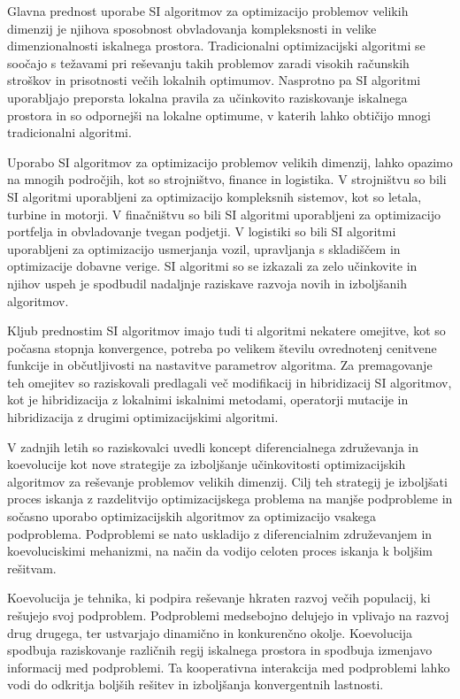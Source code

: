 Glavna prednost uporabe SI algoritmov za optimizacijo problemov velikih dimenzij je njihova sposobnost obvladovanja kompleksnosti in velike dimenzionalnosti iskalnega prostora.
Tradicionalni optimizacijski algoritmi se soočajo s težavami pri reševanju takih problemov zaradi visokih računskih stroškov in prisotnosti večih lokalnih optimumov.
Nasprotno pa SI algoritmi uporabljajo preporsta lokalna pravila za učinkovito raziskovanje iskalnega prostora in so odpornejši na lokalne optimume, v katerih lahko obtičijo mnogi tradicionalni algoritmi.

Uporabo SI algoritmov za optimizacijo problemov velikih dimenzij, lahko opazimo na mnogih področjih, kot so strojništvo, finance in logistika.
V strojništvu so bili SI algoritmi uporabljeni za optimizacijo kompleksnih sistemov, kot so letala, turbine in motorji.
V finačništvu so bili SI algoritmi uporabljeni za optimizacijo portfelja in obvladovanje tvegan podjetji.
V logistiki so bili SI algoritmi uporabljeni za optimizacijo usmerjanja vozil, upravljanja s skladiščem in optimizacije dobavne verige.
SI algoritmi so se izkazali za zelo učinkovite in njihov uspeh je spodbudil nadaljnje raziskave razvoja novih in izboljšanih algoritmov.

Kljub prednostim SI algoritmov imajo tudi ti algoritmi nekatere omejitve, kot so počasna stopnja konvergence, potreba po velikem številu ovrednotenj cenitvene funkcije in občutljivosti na nastavitve parametrov algoritma.
Za premagovanje teh omejitev so raziskovali predlagali več modifikacij in hibridizacij SI algoritmov, kot je hibridizacija z lokalnimi iskalnimi metodami, operatorji mutacije in hibridizacija z drugimi optimizacijskimi algoritmi.

V zadnjih letih so raziskovalci uvedli koncept diferencialnega združevanja in koevolucije kot nove strategije za izboljšanje učinkovitosti optimizacijskih algoritmov za reševanje problemov velikih dimenzij.
Cilj teh strategij je izboljšati proces iskanja z razdelitvijo optimizacijskega problema na manjše podprobleme in sočasno uporabo optimizacijskih algoritmov za optimizacijo vsakega podproblema.
Podproblemi se nato uskladijo z diferencialnim združevanjem in koevoluciskimi mehanizmi, na način da vodijo celoten proces iskanja k boljšim rešitvam.

Koevolucija je tehnika, ki podpira reševanje hkraten razvoj večih populacij, ki rešujejo svoj podproblem.
Podproblemi medsebojno delujejo in vplivajo na razvoj drug drugega, ter ustvarjajo dinamično in konkurenčno okolje.
Koevolucija spodbuja raziskovanje različnih regij iskalnega prostora in spodbuja izmenjavo informacij med podproblemi.
Ta kooperativna interakcija med podproblemi lahko vodi do odkritja boljših rešitev in izboljšanja konvergentnih lastnosti.

